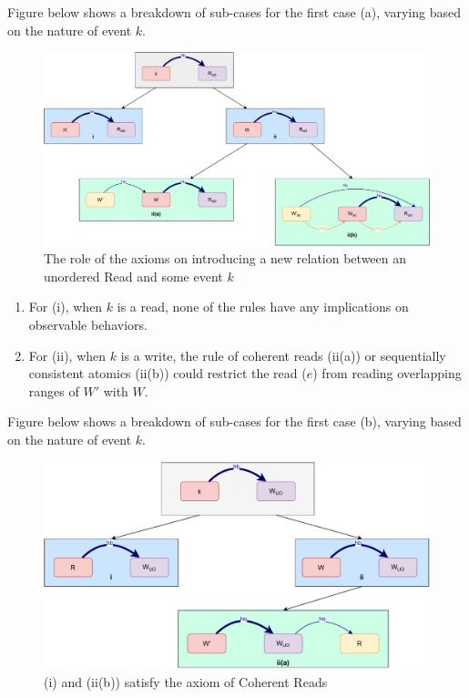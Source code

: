     Figure below shows a breakdown of sub-cases for the first case (a), varying based
    on the nature of event $k$.
    \begin{figure}[H]
        \centering
        \includegraphics[scale=0.6]{InstructionReordering/ValidReorderingProof/ProofParts/Part4/part4(a).pdf}
        \caption{The role of the axioms on introducing a new relation between an unordered Read and some event $k$}
        \label{fig:my_label}
    \end{figure}
    
    \begin{enumerate}
        \item For (i), when $k$ is a read, none of the rules have any implications on observable behaviors.
        \item For (ii), when $k$ is a write, the rule of coherent reads (ii(a)) or sequentially consistent atomics (ii(b)) could restrict the read ($e$) from reading overlapping ranges of $W'$ with $W$.
    \end{enumerate}
  
  
    Figure below shows a breakdown of sub-cases for the first case (b), varying based
    on the nature of event $k$.
    \begin{figure}[H]
        \centering
        \includegraphics[scale=0.6]{InstructionReordering/ValidReorderingProof/ProofParts/Part4/part4(b).pdf}
        \caption{(i) and (ii(b)) satisfy the axiom of Coherent Reads}
        \label{fig:my_label}
    \end{figure}
          
